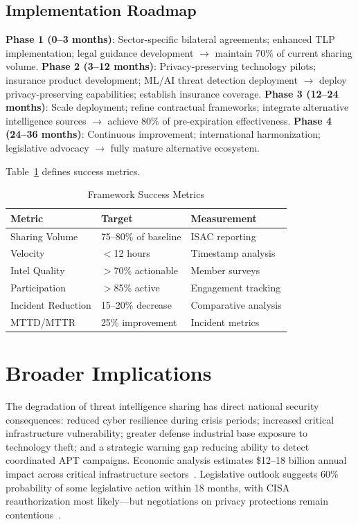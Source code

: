 \documentclass[journal]{IEEEtran}
\begin{document}
\subsection{Implementation Roadmap}

\textbf{Phase 1 (0--3 months)}: Sector-specific bilateral agreements; enhanced TLP implementation; legal guidance development $\to$ maintain 70\% of current sharing volume. \textbf{Phase 2 (3--12 months)}: Privacy-preserving technology pilots; insurance product development; ML/AI threat detection deployment $\to$ deploy privacy-preserving capabilities; establish insurance coverage. \textbf{Phase 3 (12--24 months)}: Scale deployment; refine contractual frameworks; integrate alternative intelligence sources $\to$ achieve 80\% of pre-expiration effectiveness. \textbf{Phase 4 (24--36 months)}: Continuous improvement; international harmonization; legislative advocacy $\to$ fully mature alternative ecosystem.

Table~\ref{tab:metrics} defines success metrics.

\begin{table}[!t]
\caption{Framework Success Metrics}
\centering\small
\begin{tabular}{@{}p{2.4cm}p{2.0cm}p{2.5cm}@{}}
\toprule
\textbf{Metric} & \textbf{Target} & \textbf{Measurement} \\
\midrule
Sharing Volume   & 75--80\% of baseline & ISAC reporting \\
Velocity         & $<$12 hours          & Timestamp analysis \\
Intel Quality    & $>$70\% actionable   & Member surveys \\
Participation    & $>$85\% active       & Engagement tracking \\
Incident Reduction & 15--20\% decrease  & Comparative analysis \\
MTTD/MTTR        & 25\% improvement     & Incident metrics \\
\bottomrule
\end{tabular}
\label{tab:metrics}
\end{table}

\section{Broader Implications}

The degradation of threat intelligence sharing has direct national security consequences: reduced cyber resilience during crisis periods; increased critical infrastructure vulnerability; greater defense industrial base exposure to technology theft; and a strategic warning gap reducing ability to detect coordinated APT campaigns. Economic analysis estimates \$12--18 billion annual impact across critical infrastructure sectors~\cite{ponemon2025cost}. Legislative outlook suggests 60\% probability of some legislative action within 18 months, with CISA reauthorization most likely---but negotiations on privacy protections remain contentious~\cite{nakashima2025legislative,politico2025analysis}.
\end{document}
